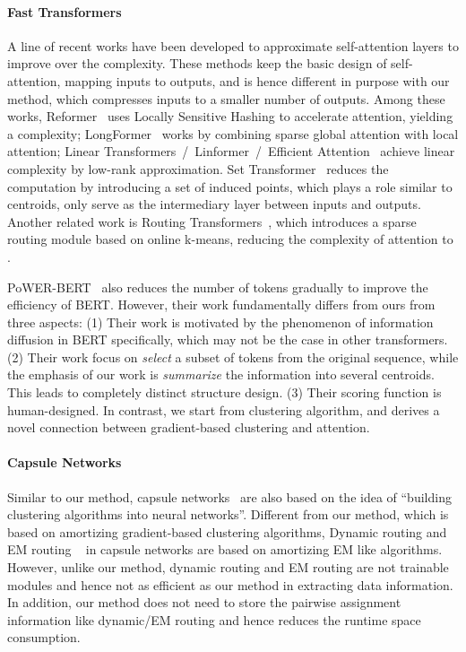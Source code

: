 \documentclass[english]{article}
\begin{document}
\paragraph{Fast Transformers}
A line of recent works have been developed to approximate self-attention layers to improve over the  complexity.
These methods keep the basic design of self-attention, mapping  inputs to  outputs, and is hence different in purpose with our method, which compresses  inputs to a smaller number  of outputs.
Among these works,
Reformer~\citep{kitaev2019reformer} uses Locally Sensitive Hashing to accelerate  attention, yielding a  complexity; LongFormer~\citep{beltagy2020longformer} works by combining sparse global attention with local attention; Linear Transformers~\citep{katharopoulos2020transformers}/~Linformer~\citep{wang2020linformer}/~Efficient Attention~\citep{shen2018efficient} achieve linear  complexity by low-rank approximation.
Set Transformer~\citep{lee2019set}
reduces the computation by introducing a set of induced points, which plays a role similar to centroids, only serve as the intermediary layer between  inputs and  outputs.
Another related work is Routing Transformers~\citep{roy2020efficient}, which introduces a sparse routing module based on online k-means, reducing the complexity of attention to .


PoWER-BERT~\citep{goyal2020power} also reduces the number of tokens gradually to improve the efficiency of BERT. However, their work fundamentally differs from ours from three aspects: (1) Their work is motivated by the phenomenon of information diffusion in BERT specifically, which may not be the case in other transformers. (2) Their work focus on \emph{select} a subset of tokens from the original sequence, while the emphasis of our work is \emph{summarize} the information into several centroids. This leads to completely distinct structure design. (3) Their scoring function is human-designed. In contrast, we start from clustering algorithm, and derives a novel connection between gradient-based clustering and attention. 




\paragraph{Capsule Networks}Similar to our method, capsule networks~\citep{hinton2011transforming} are also based on the idea of ``building clustering algorithms into neural networks''.  Different from our method, which is based on amortizing gradient-based clustering algorithms,
Dynamic routing and EM routing
~\citep{sabour2017dynamic, wang2018optimization, hinton2018matrix} in
capsule networks are based on amortizing EM like algorithms.
However, unlike our method,
 dynamic routing and EM routing are not trainable modules and
 hence not as efficient as our method in extracting data information.
In addition, our method does not need to store the pairwise assignment information like dynamic/EM routing and hence
reduces the runtime space consumption.
\end{document}
